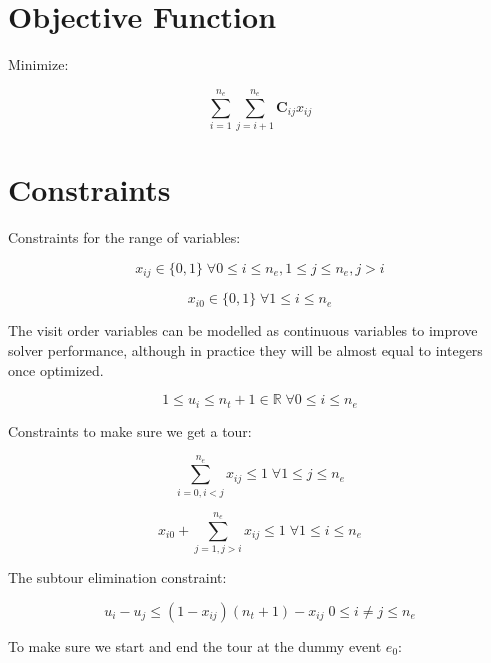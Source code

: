 \documentclass[11pt]{article}
\begin{document}
\section{Objective Function}
Minimize:

\begin{equation} \label{eq:objective}
\sum_{i=1}^{n_e} \sum_{j=i+1}^{n_e} \mathbf{C}_{ij} x_{ij}
\end{equation}

\section{Constraints}
Constraints for the range of variables:

\begin{equation} \label{constr:x}
    x_{ij} \in \{0, 1\} \; \forall 0 \leq i \leq n_e, 1 \leq j \leq n_e, j > i
\end{equation}

\begin{equation} \label{constr:x_dummy}
    x_{i0} \in \{0, 1\} \; \forall 1 \leq i \leq n_e
\end{equation}

The visit order variables can be modelled as continuous variables to improve solver performance, although in practice they will be almost equal to integers once optimized.

\begin{equation} \label{constr:u}
    1 \leq u_i \leq n_t + 1 \in \mathbb{R} \; \forall 0 \leq i \leq n_e
\end{equation}

Constraints to make sure we get a tour:

\begin{equation} \label{constr:in_edge}
    \sum_{i=0, i < j}^{n_e} x_{ij} \leq 1 \; \forall 1 \leq j \leq n_e
\end{equation}

\begin{equation} \label{constr:out_edge}
    x_{i0} + \sum_{j=1, j > i}^{n_e} x_{ij} \leq 1 \; \forall 1 \leq i \leq n_e
\end{equation}

The subtour elimination constraint:

\begin{equation} \label{constr:order}
    u_i - u_j \leq (1 - x_{ij})(n_t + 1) - x_{ij} \; 0 \leq i \neq j \leq n_e
\end{equation}

To make sure we start and end the tour at the dummy event $e_0$:
\end{document}
